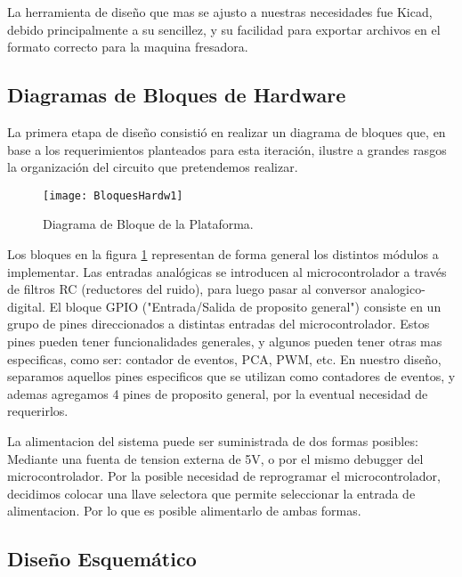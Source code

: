 La herramienta de diseño que mas se ajusto a nuestras necesidades fue Kicad, debido principalmente a su sencillez, y su facilidad para exportar archivos en el formato correcto para la maquina fresadora.


\subsection{Diagramas de Bloques de Hardware}
\label{it3:sub:diagrama_de_bloques_de_hardware}

La primera etapa de diseño consistió en realizar un diagrama de bloques que, en base a los requerimientos planteados para esta iteración, ilustre a grandes rasgos la organización del circuito que pretendemos realizar.

\begin{figure}[h]
  \centering
  \texttt{[image: BloquesHardw1]}
  \caption{Diagrama de Bloque de la Plataforma.}\label{fig:BloquesHardw1}
\end{figure}

Los bloques en la figura \ref{fig:BloquesHardw1} representan de forma general los distintos módulos a implementar. Las entradas analógicas se introducen al microcontrolador a través de filtros RC (reductores del ruido), para luego pasar al conversor analogico-digital. El bloque GPIO ("Entrada/Salida de proposito general") consiste en un grupo de pines direccionados a distintas entradas del microcontrolador. Estos pines pueden tener funcionalidades generales, y algunos pueden tener otras mas especificas, como ser: contador de eventos, PCA, PWM, etc. En nuestro diseño, separamos aquellos pines especificos que se utilizan como contadores de eventos, y ademas agregamos 4 pines de proposito general, por la eventual necesidad de requerirlos. 

La alimentacion del sistema puede ser suministrada de dos formas posibles: Mediante una fuenta de tension externa de 5V, o por el mismo debugger del microcontrolador. Por la posible necesidad de reprogramar el microcontrolador, decidimos colocar una llave selectora que permite seleccionar la entrada de alimentacion. Por lo que es posible alimentarlo de ambas formas.


\subsection{Diseño Esquemático}
\label{it3:sub:diseno_esquematico}

